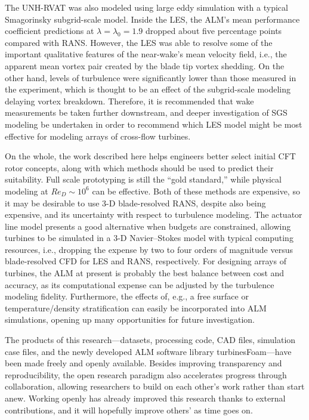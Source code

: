 The UNH-RVAT was also modeled using large eddy simulation with a typical
Smagorinsky subgrid-scale model. Inside the LES, the ALM's mean performance
coefficient predictions at $\lambda=\lambda_0=1.9$ dropped about five percentage
points compared with RANS. However, the LES was able to resolve some of the
important qualitative features of the near-wake's mean velocity field, i.e., the
apparent mean vortex pair created by the blade tip vortex shedding. On the other
hand, levels of turbulence were significantly lower than those measured in the
experiment, which is thought to be an effect of the subgrid-scale modeling
delaying vortex breakdown. Therefore, it is recommended that wake measurements
be taken further downstream, and deeper investigation of SGS modeling be
undertaken in order to recommend which LES model might be most effective for
modeling arrays of cross-flow turbines.

On the whole, the work described here helps engineers better select initial CFT
rotor concepts, along with which methods should be used to predict their
suitability. Full scale prototyping is still the ``gold standard,'' while
physical modeling at $Re_D \sim 10^6$ can be effective. Both of these methods
are expensive, so it may be desirable to use 3-D blade-resolved RANS, despite
also being expensive, and its uncertainty with respect to turbulence modeling.
The actuator line model presents a good alternative when budgets are
constrained, allowing turbines to be simulated in a 3-D Navier--Stokes model
with typical computing resources, i.e., dropping the expense by two to four
orders of magnitude versus blade-resolved CFD for LES and RANS, respectively.
For designing arrays of turbines, the ALM at present is probably the best
balance between cost and accuracy, as its computational expense can be adjusted
by the turbulence modeling fidelity. Furthermore, the effects of, e.g., a free
surface or temperature/density stratification can easily be incorporated into
ALM simulations, opening up many opportunities for future investigation.

The products of this research---datasets, processing code, CAD files, simulation
case files, and the newly developed ALM software library turbinesFoam---have
been made freely and openly available. Besides improving transparency and
reproducibility, the open research paradigm also accelerates progress through
collaboration, allowing researchers to build on each other's work rather than
start anew. Working openly has already improved this research thanks to external
contributions, and it will hopefully improve others' as time goes on.
